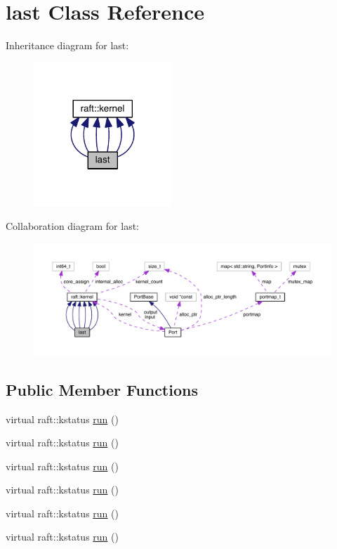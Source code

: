 \hypertarget{classlast}{}\section{last Class Reference}
\label{classlast}


Inheritance diagram for last\+:
\nopagebreak
\begin{figure}[H]
\begin{center}
\leavevmode
\includegraphics[width=148pt]{classlast__inherit__graph}
\end{center}
\end{figure}


Collaboration diagram for last\+:
\nopagebreak
\begin{figure}[H]
\begin{center}
\leavevmode
\includegraphics[width=350pt]{classlast__coll__graph}
\end{center}
\end{figure}
\subsection*{Public Member Functions}
\begin{DoxyCompactItemize}
\item 
virtual raft\+::kstatus \hyperlink{classlast_a7a1da1c30f571a8e8ccb515ca2cb2f02}{run} ()
\item 
virtual raft\+::kstatus \hyperlink{classlast_a7a1da1c30f571a8e8ccb515ca2cb2f02}{run} ()
\item 
virtual raft\+::kstatus \hyperlink{classlast_a7a1da1c30f571a8e8ccb515ca2cb2f02}{run} ()
\item 
virtual raft\+::kstatus \hyperlink{classlast_a7a1da1c30f571a8e8ccb515ca2cb2f02}{run} ()
\item 
virtual raft\+::kstatus \hyperlink{classlast_a7a1da1c30f571a8e8ccb515ca2cb2f02}{run} ()
\item 
virtual raft\+::kstatus \hyperlink{classlast_a7a1da1c30f571a8e8ccb515ca2cb2f02}{run} ()
\end{DoxyCompactItemize}

